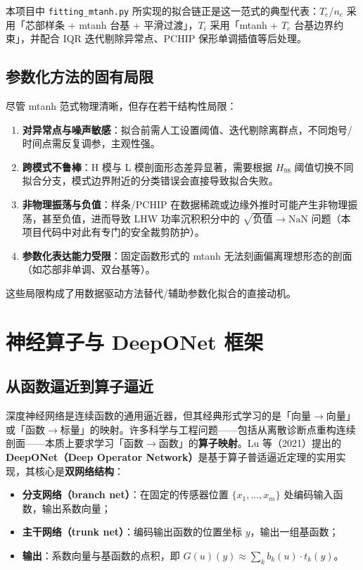 \documentclass[12pt,a4paper]{article}
\begin{document}
本项目中 \texttt{fitting\_mtanh.py} 所实现的拟合链正是这一范式的典型代表：$T_e$/$n_e$ 采用「芯部样条 + mtanh 台基 + 平滑过渡」，$T_i$ 采用「mtanh + $T_e$ 台基边界约束」，并配合 IQR 迭代剔除异常点、PCHIP 保形单调插值等后处理。

\subsection{参数化方法的固有局限}

尽管 mtanh 范式物理清晰，但存在若干结构性局限：

\begin{enumerate}[label=\arabic*.]
    \item \textbf{对异常点与噪声敏感}：拟合前需人工设置阈值、迭代剔除离群点，不同炮号/时间点需反复调参，主观性强。
    \item \textbf{跨模式不鲁棒}：H 模与 L 模剖面形态差异显著，需要根据 $H_{98}$ 阈值切换不同拟合分支，模式边界附近的分类错误会直接导致拟合失败。
    \item \textbf{非物理振荡与负值}：样条/PCHIP 在数据稀疏或边缘外推时可能产生非物理振荡，甚至负值，进而导致 LHW 功率沉积积分中的 $\sqrt{\text{负值}}\to\text{NaN}$ 问题（本项目代码中对此有专门的安全裁剪防护）。
    \item \textbf{参数化表达能力受限}：固定函数形式的 mtanh 无法刻画偏离理想形态的剖面（如芯部非单调、双台基等）。
\end{enumerate}

这些局限构成了用数据驱动方法替代/辅助参数化拟合的直接动机。

\section{神经算子与 DeepONet 框架}

\subsection{从函数逼近到算子逼近}

深度神经网络是连续函数的通用逼近器，但其经典形式学习的是「向量$\to$向量」或「函数$\to$标量」的映射。许多科学与工程问题——包括从离散诊断点重构连续剖面——本质上要求学习「函数$\to$函数」的\textbf{算子映射}。Lu 等（2021）提出的\textbf{DeepONet（Deep Operator Network）}是基于算子普适逼近定理的实用实现，其核心是\textbf{双网络结构}：

\begin{itemize}
    \item \textbf{分支网络（branch net）}：在固定的传感器位置 $\{x_1,\dots,x_m\}$ 处编码输入函数，输出系数向量；
    \item \textbf{主干网络（trunk net）}：编码输出函数的位置坐标 $y$，输出一组基函数；
    \item \textbf{输出}：系数向量与基函数的点积，即 $G(u)(y) \approx \sum_k b_k(u)\cdot t_k(y)$。
\end{itemize}
\end{document}
